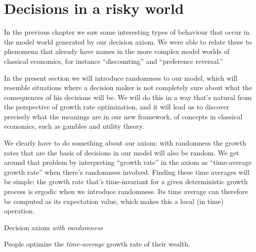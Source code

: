 \chapter{Decisions in a risky world}
In the previous chapter we saw some interesting types of behaviour that occur in the model world generated by our decision axiom. We were able to relate these to phenomena that already have names in the more complex model worlds of classical economics, for instance ``discounting'' and ``preference reversal.''

In the present section we will introduce randomness to our model, which will resemble situations where a decision maker is not completely sure about what the consequences of his decisions will be. We will do this in a way that's natural from the perspective of growth rate optimization, and it will lead us to discover precisely what the meanings are in our new framework, of concepts in classical economics, such as gambles and utility theory.

We clearly have to do something about our axiom: with randomness the growth rates that are the basis of decisions in our model will also be random. We get around that problem by interpreting ``growth rate'' in the axiom as ``time-average growth rate'' when there's randomness involved. Finding these time averages will be simple: the growth rate that's time-invariant for a given deterministic growth process is ergodic when we introduce randomness. Its time average can therefore be computed as its expectation value, which makes this a local (in time) operation.

\begin{keypts}{Decision axiom {\it with randomness}}

People optimize the {\it time-average} growth rate of their wealth.

\end{keypts}


